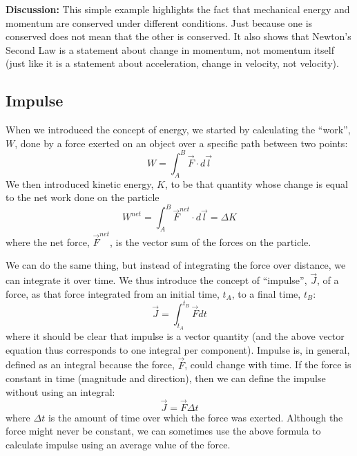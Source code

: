 \documentclass[9pt,arxiv,red]{lapreprint}
\begin{document}
\begin{framed}
\begin{framed}
\textbf{Discussion:} This simple example highlights the fact that mechanical energy and momentum are conserved under different conditions. Just because one is conserved does not mean that the other is conserved. It also shows that Newton's Second Law is a statement about change in momentum, not momentum itself (just like it is a statement about acceleration, change in velocity, not velocity).
\end{framed}
\end{framed}

\subsection{Impulse}

When we introduced the concept of energy, we started by calculating the ``work'', $W$, done by a force exerted on an object over a specific path between two points:
\begin{equation}
W = \int_A^B \vec F \cdot d\vec l
\end{equation}
We then introduced kinetic energy, $K$, to be that quantity whose change is equal to the net work done on the particle
\begin{equation}
W^{net} = \int_A^B \vec F^{net}\cdot d\vec l = \Delta K
\end{equation}
where the net force, $\vec F^{net}$, is the vector sum of the forces on the particle.

We can do the same thing, but instead of integrating the force over distance, we can integrate it over time. We thus introduce the concept of ``impulse'', $\vec J$, of a force, as that force integrated from an initial time, $t_A$, to a final time, $t_B$:
\begin{equation}
\vec J = \int_{t_A}^{t_B}\vec F dt
\end{equation}
where it should be clear that impulse is a vector quantity (and the above vector equation thus corresponds to one integral per component). Impulse is, in general, defined as an integral because the force, $\vec F$, could change with time. If the force is constant in time (magnitude and direction), then we can define the impulse without using an integral:
\begin{equation}
\vec J = \vec F \Delta t
\end{equation}
where $\Delta t$ is the amount of time over which the force was exerted. Although the force might never be constant, we can sometimes use the above formula to calculate impulse using an average value of the force.
\end{document}
